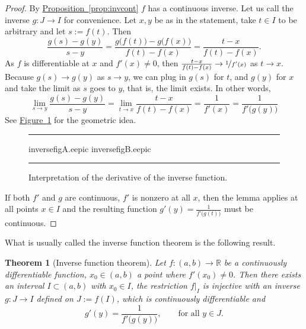 \documentclass[12pt]{book}
\newenvironment{myfigureht}{%
\begin{figure}[h!t]
\noindent\rule{\textwidth}{0.4pt}\vspace{12pt}\par\centering}%
{\par\noindent\rule{\textwidth}{0.4pt}
\end{figure}}
\newcommand{\R}{{\mathbb{R}}}
\theoremstyle{plain}
\newtheorem{thm}{Theorem}[section]
\theoremstyle{remark}
\theoremstyle{definition}
\theoremstyle{exercise}
\theoremstyle{example}
\newcommand{\figureref}[1]{\hyperref[#1]{Figure~\ref*{#1}}}
\newcommand{\propref}[1]{\hyperref[#1]{Proposition~\ref*{#1}}}
\begin{document}
\begin{proof}
By \propref{prop:invcont} $f$ has a continuous inverse.  Let us
call the inverse $g \colon J \to I$ for convenience.
Let $x,y$ be as in the statement, take $t \in I$ to be arbitrary
and let $s := f(t)$.
Then
\begin{equation*}
\frac{g(s)-g(y)}{s-y} =
\frac{g\bigl(f(t)\bigr)-g\bigl(f(x)\bigr)}{f(t)-f(x)} =
\frac{t-x}{f(t)-f(x)} .
\end{equation*}
As $f$ is differentiable at $x$ and $f'(x) \not= 0$, then 
$\frac{t-x}{f(t)-f(x)} \to \nicefrac{1}{f'(x)}$ as $t \to x$.
Because $g(s) \to g(y)$ as $s \to y$, we 
can plug in $g(s)$ for $t$, and $g(y)$ for $x$ and take the limit
as $s$ goes to $y$, that is, the limit exists.  In other words,
\begin{equation*}
\lim_{s \to y}
\frac{g(s)-g(y)}{s-y} 
=
\lim_{t \to x} \frac{t-x}{f(t)-f(x)} 
=
\frac{1}{f'(x)} 
=
\frac{1}{f'\bigl(g(y)\bigr)}
\end{equation*}
See \figureref{inversefig} for the geometric idea.
\begin{myfigureht}
{inversefigA.eepic}
\quad
{inversefigB.eepic}
\caption{Interpretation of the derivative of the inverse
function.\label{inversefig}}
\end{myfigureht}

If both $f'$ and $g$ are continuous, $f'$ is nonzero at all $x$,
then the lemma applies at all points $x \in I$ and the resulting function $g'(y) =
\frac{1}{f'\bigl(g(t)\bigr)}$ must be continuous.
\end{proof}

What is usually called the inverse function theorem is the following result.

\begin{thm}[Inverse function theorem]
Let $f \colon (a,b) \to \R$ be a continuously differentiable function,
$x_0 \in (a,b)$ a point where $f'(x_0) \not= 0$.  Then there exists
an interval $I \subset (a,b)$ with $x_0 \in I$, the
restriction $f|_{I}$ is injective with an inverse
$g \colon J \to I$ defined on $J := f(I)$,
which is continuously differentiable and
\begin{equation*}
g'(y) = \frac{1}{f'\bigl( g(y) \bigr)} , \qquad \text{for all $y \in J$}.
\end{equation*}
\end{thm}
\end{document}
